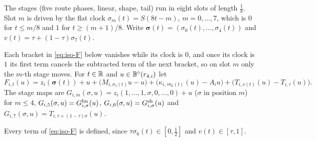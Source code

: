 The stages (five route phases, linear, shape, tail) run in eight slots of length $\frac18$. Slot $m$ is driven by the flat clock $\sigma_m(t)=S(8t-m)$, $m=0,\dots,7$, which is $0$ for $t\le m/8$ and $1$ for $t\ge(m+1)/8$. Write $\boldsymbol\sigma(t)=(\sigma_0(t),\dots,\sigma_4(t))$ and $v(t)=\tau+(1-\tau)\sigma_7(t)$.

\begin{construction}\label{cons:iso-isotopy}
Each bracket in \eqref{eq:iso-F} below vanishes while its clock is $0$, and once its clock is $1$ its first term cancels the
subtracted term of the next bracket, so on slot $m$ only the $m$-th stage moves. For $t\in\mathbb{R}$ and $u\in\mathbb{B}^\circ(r_{4,i})$ let
\begin{equation}\label{eq:iso-F}
 F_{i,t}(u)=z_i(\boldsymbol\sigma(t))+u+\big(M_{i,\sigma_5(t)}u-u\big)+\big(\kappa_{i,\tau\sigma_6(t)}(u)-A_iu\big)
 +\big(T_{i,v(t)}(u)-T_{i,\tau}(u)\big).
\end{equation}
The stage maps are $G_{i,m}(\sigma,u)=z_i(1,\dots,1,\sigma,0,\dots,0)+u$ ($\sigma$ in position $m$) for $m\le4$,
$G_{i,5}(\sigma,u)=G^{\rm lin}_{i,\sigma}(u)$, $G_{i,6}(\sigma,u)=G^{\rm sh}_{i,\sigma}(u)$ and
$G_{i,7}(\sigma,u)=T_{i,\tau+(1-\tau)\sigma}(u)$.
\end{construction}

Every term of \eqref{eq:iso-F} is defined, since $\tau\sigma_6(t)\in[0,\frac12]$ and $v(t)\in[\tau,1]$.

